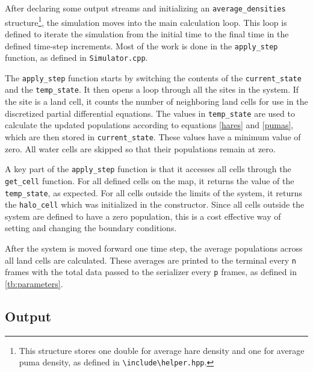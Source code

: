 \documentclass[a4paper,11pt]{article}
\begin{document}
After declaring some output streams and initializing an \texttt{average\_densities} structure\footnote{This structure stores one double for average hare density and one for average puma density, as defined in \texttt{\textbackslash include\textbackslash helper.hpp}.}, the simulation moves into the main calculation loop.  This loop is defined to iterate the simulation from the initial time to the final time in the defined time-step increments.  Most of the work is done in the \texttt{apply\_step} function, as defined in \texttt{Simulator.cpp}.  

The  \texttt{apply\_step} function starts by switching the contents of the  \texttt{current\_state} and the \texttt{temp\_state}.  It then opens a loop through all the sites in the system.  If the site is a land cell, it counts the number of neighboring land cells for use in the discretized partial differential equations.  The values in \texttt{temp\_state} are used to calculate the updated populations according to equations \eqref{hares} and \eqref{pumas}, which are then stored in \texttt{current\_state}.  These values have a minimum value of zero.  All water cells are skipped so that their populations remain at zero.


A key part of the \texttt{apply\_step} function is that it accesses all cells through the \texttt{get\_cell} function.  For all defined cells on the map, it returns the value of the \texttt{temp\_state}, as expected.  For all cells outside the limits of the system, it returns the \texttt{halo\_cell} which was initialized in the constructor.  Since all cells outside the system are defined to have a zero population, this is a cost effective way of setting and changing the boundary conditions.


After the system is moved forward one time step, the average populations across all land cells are calculated.  These averages are printed to the terminal every \texttt{n} frames with the total data passed to the serializer every \texttt{p} frames, as defined in \ref{tb:parameters}.

\subsection{Output}\label{output}
\end{document}
